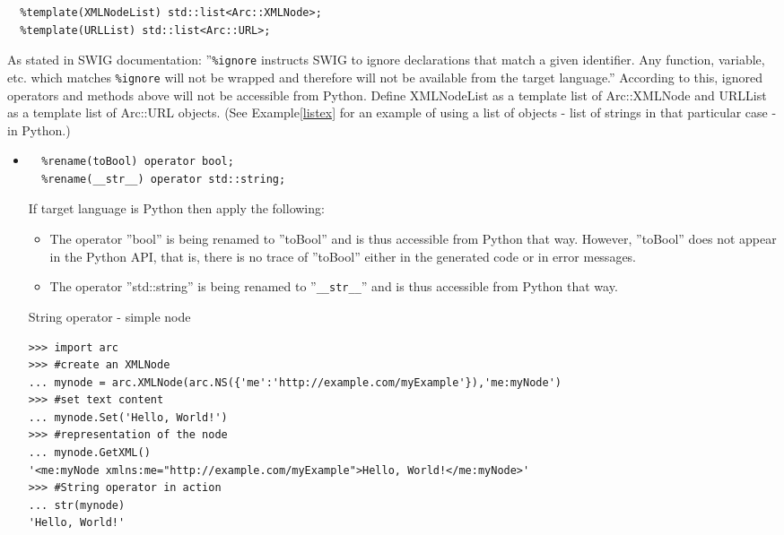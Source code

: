 \documentclass{article}
\begin{document}
\begin{flushleft}
\begin{itemize}
{\begin{verbatim}
  %template(XMLNodeList) std::list<Arc::XMLNode>;
  %template(URLList) std::list<Arc::URL>;
  \end{verbatim}
  }
  As stated in SWIG documentation: ''\verb$%ignore$ instructs SWIG to ignore 
  declarations that match a given identifier.
  Any function, variable, etc. which matches \verb$%ignore$ will not be wrapped 
  and therefore will not be available from the target language.''
  According to this, ignored operators and methods above will not be accessible 
  from Python. \linebreak
  Define XMLNodeList as a template list of Arc::XMLNode and URLList as a template list of 
  Arc::URL objects. (See Example\ref{listex} for an example of using a list of objects - 
  list of strings in that particular case - in Python.)\linebreak
\end{itemize}
\begin{itemize}
  \item{
\begin{verbatim}
  %rename(toBool) operator bool;
  %rename(__str__) operator std::string;
\end{verbatim} 
    If target language is Python then apply the following:
    \begin{itemize}
      \item{
      The operator ''bool'' is being renamed to ''toBool'' and is thus accessible from Python that way. 
      However, ''toBool'' does not appear in the Python API, that is, there is no trace of ''toBool'' 
      either in the generated code or in error messages.
      }
      \item{
      The operator ''std::string'' is being renamed to ''\verb$__str__$'' and is thus accessible from 
      Python that way.
      }
    \end{itemize}
    \begin{example}
      \caption{String operator - simple node}\label{strex1}
\begin{verbatim}
>>> import arc
>>> #create an XMLNode
... mynode = arc.XMLNode(arc.NS({'me':'http://example.com/myExample'}),'me:myNode')
>>> #set text content
... mynode.Set('Hello, World!')
>>> #representation of the node
... mynode.GetXML()
'<me:myNode xmlns:me="http://example.com/myExample">Hello, World!</me:myNode>'
>>> #String operator in action
... str(mynode)
'Hello, World!'
\end{verbatim}
    \end{example}
    \begin{example}

\end{example}}
\end{itemize}
\end{flushleft}
\end{document}

